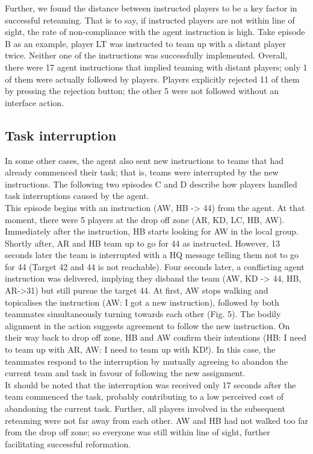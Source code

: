 Further, we found the distance between instructed players to be a key factor in successful reteaming. That is to say, if instructed players are not within line of sight, the rate of non-compliance with the agent instruction is high. Take episode B as an example, player LT was instructed to team up with a distant player twice. Neither one of the instructions was successfully implemented. Overall, there were 17 agent instructions that implied teaming with distant players; only 1 of them were actually followed by players. Players explicitly rejected 11 of them by pressing the rejection button; the other 5 were not followed without an interface action.\\

\subsection{Task interruption}
In some other cases, the agent also sent new instructions to teams that had already commenced their task; that is, teams were interrupted by the new instructions. The following two episodes C and D describe how players handled task interruptions caused by the agent.\\

This episode begins with an instruction (AW, HB -> 44) from the agent. At that moment, there were 5 players at the drop off zone (AR, KD, LC, HB, AW). Immediately after the instruction, HB starts looking for AW in the local group. Shortly after, AR and HB team up to go for 44 as instructed.  However, 13 seconds later the team is interrupted with a HQ message telling them not to go for 44 (Target 42 and 44 is not reachable). Four seconds later, a conflicting agent instruction was delivered, implying they disband the team (AW, KD -> 44, HB, AR->31) but still pursue the target 44. At first, AW stops walking and topicalises the instruction (AW: I got a new instruction), followed by both teammates simultaneously turning towards each other (Fig. 5). The bodily alignment in the action suggests agreement to follow the new instruction. On their way back to drop off zone, HB and AW confirm their intentions (HB: I need to team up with AR, AW: I need to team up with KD!). In this case, the teammates respond to the interruption by mutually agreeing to abandon the current team and task in favour of following the new assignment. \\

It should be noted that the interruption was received only 17 seconds after the team commenced the task, probably contributing to a low perceived cost of abandoning the current task. Further, all players involved in the subsequent reteaming were not far away from each other. AW and HB had not walked too far from the drop off zone; so everyone was still within line of sight, further facilitating successful reformation. \\

